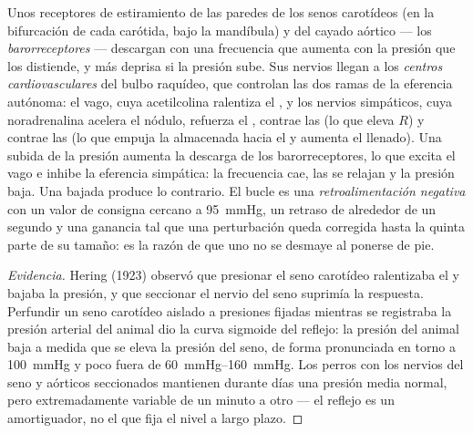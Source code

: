 \begin{definition}[El barorreflejo]\label{def:b2:blood-pressure:baroreflex}
Unos receptores de estiramiento de las paredes de los senos carotídeos (en
la bifurcación de cada  carótida, bajo la mandíbula) y del cayado
aórtico --- los \emph{barorreceptores} --- descargan con una frecuencia que
aumenta con la presión que los distiende, y más deprisa si la presión
sube. Sus nervios llegan a los \emph{centros cardiovasculares} del bulbo
raquídeo, que controlan las dos ramas de la eferencia autónoma: el vago,
cuya acetilcolina ralentiza el , y los nervios
simpáticos, cuya noradrenalina acelera el nódulo, refuerza el ,
contrae las  (lo que eleva $R$) y contrae las  (lo que
empuja la  almacenada hacia el  y aumenta el llenado). Una
subida de la presión aumenta la descarga de los barorreceptores, lo que
excita el vago e inhibe la eferencia simpática: la frecuencia cae, las
 se relajan y la presión baja. Una bajada produce lo contrario.
El bucle es una \emph{retroalimentación negativa} con un valor de consigna
cercano a \qty{95}{mmHg}, un retraso de alrededor de un segundo y una
ganancia tal que una perturbación queda corregida hasta la quinta parte de
su tamaño: es la razón de que uno no se desmaye al ponerse de pie.
\end{definition}
\begin{proof}[Evidencia]
Hering (1923) observó que presionar el seno carotídeo ralentizaba el
 y bajaba la presión, y que seccionar el nervio del seno suprimía la
respuesta. Perfundir un seno carotídeo aislado a presiones fijadas
mientras se registraba la presión arterial del animal dio la curva
sigmoide del reflejo: la presión del animal baja a medida que se eleva la
presión del seno, de forma pronunciada en torno a \qty{100}{mmHg} y poco
fuera de \qtyrange{60}{160}{mmHg}. Los perros con los nervios del seno y
aórticos seccionados mantienen durante días una presión media normal,
pero extremadamente variable de un minuto a otro --- el reflejo es un
amortiguador, no el que fija el nivel a largo plazo.
\end{proof}

